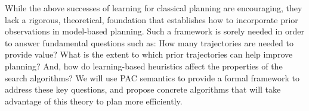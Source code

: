 \documentclass[12pt]{article}
\begin{document}
While the above successes of learning for classical planning are encouraging, they lack a rigorous, theoretical, foundation that establishes how to incorporate prior observations in model-based planning. Such a framework is sorely needed in order to answer fundamental questions such as: How many trajectories are needed to provide value? What is the extent to which prior trajectories can help improve planning? And, how do learning-based heuristics affect the properties of the search algorithms? We will use PAC semantics  to provide a formal framework to address these key questions, and propose concrete algorithms that will take advantage of this theory to plan more efficiently. 

\end{document}
